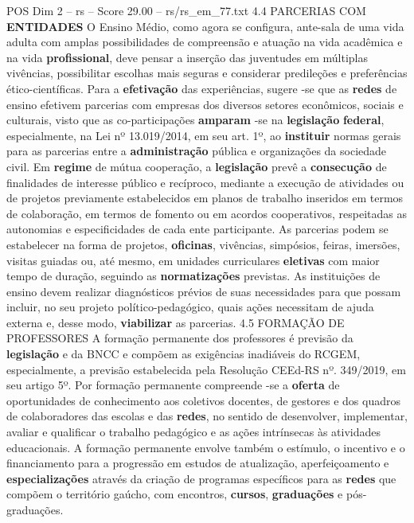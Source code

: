 \begin{textsample}{POS Dim 2 – rs – Score 29.00 – rs/rs\_em\_77.txt}  \label{ex:f2_pos_075}
4.4 PARCERIAS COM \textbf{ENTIDADES} O Ensino Médio, como agora se configura, ante-sala de uma vida adulta com amplas possibilidades de compreensão e atuação na vida acadêmica e na vida \textbf{profissional}, deve pensar a inserção das juventudes em múltiplas vivências, possibilitar escolhas mais seguras e considerar predileções e preferências ético-científicas.
Para a \textbf{efetivação} das experiências, sugere -se que as \textbf{redes} de ensino efetivem parcerias com empresas dos diversos setores econômicos, sociais e culturais, visto que as co-participações \textbf{amparam} -se na \textbf{legislação} \textbf{federal}, especialmente, na Lei nº 13.019/2014, em seu art. 1º, ao \textbf{instituir} normas gerais para as parcerias entre a \textbf{administração} pública e organizações da sociedade civil.
Em \textbf{regime} de mútua cooperação, a \textbf{legislação} prevê a \textbf{consecução} de finalidades de interesse público e recíproco, mediante a execução de atividades ou de projetos previamente estabelecidos em planos de trabalho inseridos em termos de colaboração, em termos de fomento ou em acordos cooperativos, respeitadas as autonomias e especificidades de cada ente participante.
As parcerias podem se estabelecer na forma de projetos, \textbf{oficinas}, vivências, simpósios, feiras, imersões, visitas guiadas ou, até mesmo, em unidades curriculares \textbf{eletivas} com maior tempo de duração, seguindo as \textbf{normatizações} previstas.
As instituições de ensino devem realizar diagnósticos prévios de suas necessidades para que possam incluir, no seu projeto político-pedagógico, quais ações necessitam de ajuda externa e, desse modo, \textbf{viabilizar} as parcerias. 4.5 FORMAÇÃO DE PROFESSORES A formação permanente dos professores é previsão da \textbf{legislação} e da BNCC e compõem as exigências inadiáveis do RCGEM, especialmente, a previsão estabelecida pela Resolução CEEd-RS nº. 349/2019, em seu artigo 5º.
Por formação permanente compreende -se a \textbf{oferta} de oportunidades de conhecimento aos coletivos docentes, de gestores e dos quadros de colaboradores das escolas e das \textbf{redes}, no sentido de desenvolver, implementar, avaliar e qualificar o trabalho pedagógico e as ações intrínsecas às atividades educacionais.
A formação permanente envolve também o estímulo, o incentivo e o financiamento para a progressão em estudos de atualização, aperfeiçoamento e \textbf{especializações} através da criação de programas específicos para as \textbf{redes} que compõem o território gaúcho, com encontros, \textbf{cursos}, \textbf{graduações} e pós-graduações.

\end{textsample}
